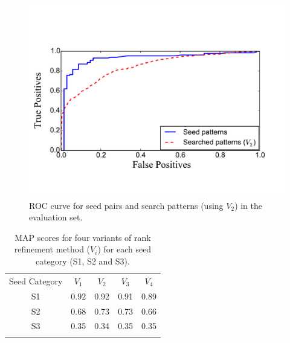 \begin{figure}
	\begin{center}
		\includegraphics[width=\figSizeEightyFive]{ch06_patterns/figures/discovery/seedROC.pdf}
	\end{center}
	\caption{ROC curve for seed pairs and search patterns (using $V_2$) in the evaluation set.}%
	\label{fig:combinedROCPatternDiscovery}
\end{figure}

\begin{table} 
	\begin{centering}	
		\begin{tabular}{ c | c c c c}
			\tabletop
			Seed Category   & $V_1$		&	$V_2$ & $V_3$	 &	$V_4$ 	\\	
			\tablemid
			S1 & 0.92    &	0.92		&	0.91    &	0.89\\
			S2 & 0.68    &	0.73		&	0.73    &	0.66\\
			S3 & 0.35    &	0.34    &	0.35    &	0.35\\
			\tablebot
		\end{tabular}
		\caption{MAP scores for four variants of rank refinement method ($V_i$) for each seed category (S1, S2 and S3).}
		\label{tab:meanAveragePrecision_pattern_discovery}
		\par \end{centering}	
\end{table}

